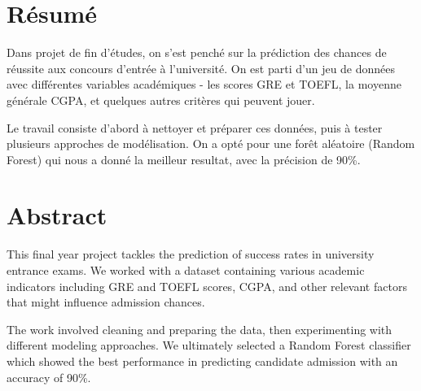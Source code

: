 \chapter*{Résumé}

Dans projet de fin d'études, on s'est penché sur la prédiction des chances de réussite aux concours d'entrée à l'université. On est parti d'un jeu de données avec différentes variables académiques - les scores GRE et TOEFL, la moyenne générale CGPA, et quelques autres critères qui peuvent jouer.

Le travail consiste d'abord à nettoyer et préparer ces données, puis à tester plusieurs approches de modélisation. On a opté pour une forêt aléatoire (Random Forest) qui nous a donné la meilleur resultat, avec la précision de 90\%.
\newline

\chapter*{Abstract}

This final year project tackles the prediction of success rates in university entrance exams. We worked with a dataset containing various academic indicators including GRE and TOEFL scores, CGPA, and other relevant factors that might influence admission chances.

The work involved cleaning and preparing the data, then experimenting with different modeling approaches. We ultimately selected a Random Forest classifier which showed the best performance in predicting candidate admission with an accuracy of 90\%.